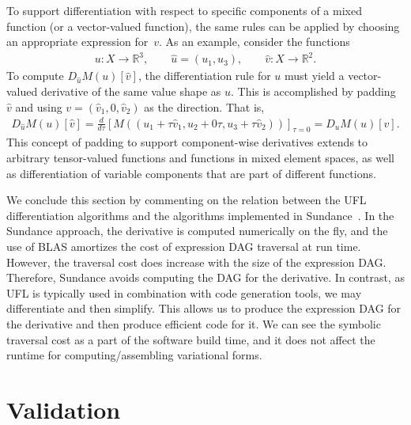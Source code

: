 \documentclass[prodmode,acmtoms]{acmsmall}
\newcommand{\R}{\mathbb{R}}
\begin{document}
To support differentiation with respect to specific components of a
mixed function (or a vector-valued function), the same rules can be
applied by choosing an appropriate expression for~$v$. As an example,
consider the functions
\begin{align}
  u: X \rightarrow \R^3, \qquad \hat{u}=(u_1, u_3), \qquad \hat{v}: X \rightarrow \R^2.
\end{align}
To compute $D_{\hat{u}} M(u) [\hat{v}]$, the differentiation rule for
$u$ must yield a vector-valued derivative of the same value shape as
$u$. This is accomplished by padding $\hat{v}$ and using
$v=(\hat{v}_1, 0, \hat{v}_2)$ as the direction. That is,
\begin{align}
D_{\hat{u}} M(u) \left[\hat{v}\right]
  = \frac{d}{d\tau} \left[
     M((u_1+\tau \hat{v}_1, u_2+0 \tau, u_3+\tau \hat{v}_2))
     \right]_{\tau=0}
  = D_{u} M(u) \left[v\right].
\end{align}
This concept of padding to support component-wise derivatives extends
to arbitrary tensor-valued functions and functions in mixed element
spaces, as well as differentiation of variable components that are
part of different functions.

We conclude this section by commenting on the relation between the UFL
differentiation algorithms and the algorithms implemented in
Sundance~\citep{long:2010}. In the Sundance approach, the derivative
is computed numerically on the fly, and the use of BLAS amortizes the
cost of expression DAG traversal at run time. However, the traversal
cost does increase with the size of the expression DAG. Therefore,
Sundance avoids computing the DAG for the
derivative. In contrast, as UFL is typically used in combination with
code generation tools, we may differentiate and then simplify. This
allows us to produce the expression DAG for the derivative and then
produce efficient code for it. We can see the symbolic traversal cost
as a part of the software build time, and it does not affect the
runtime for computing/assembling variational forms.


\section{Validation}
\label{sec:validation}
\end{document}
